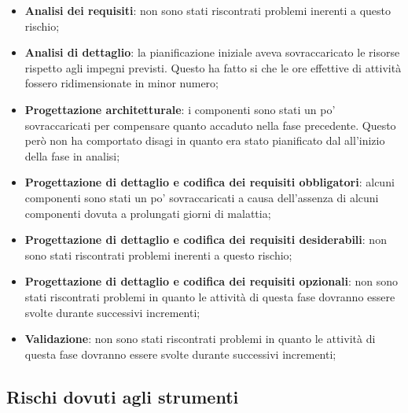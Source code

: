 			\begin{itemize}
				\item \textbf{Analisi dei requisiti}: non sono stati riscontrati problemi inerenti a questo rischio;
				\item \textbf{Analisi di dettaglio}: la pianificazione iniziale aveva sovraccaricato le risorse rispetto agli impegni previsti. Questo ha fatto si che le ore effettive di attività fossero ridimensionate in minor numero;
				\item \textbf{Progettazione architetturale}: i componenti sono stati un po' sovraccaricati per compensare quanto accaduto nella fase precedente. Questo però non ha comportato disagi in quanto era stato pianificato dal \roleProjectManager{} all'inizio della fase in analisi;
				\item \textbf{Progettazione di dettaglio e codifica dei requisiti obbligatori}: alcuni componenti sono stati un po' sovraccaricati a causa dell'assenza di alcuni componenti dovuta a prolungati giorni di malattia;
				\item \textbf{Progettazione di dettaglio e codifica dei requisiti desiderabili}: non sono stati riscontrati problemi inerenti a questo rischio;
				\item \textbf{Progettazione di dettaglio e codifica dei requisiti opzionali}: non sono stati riscontrati problemi in quanto le attività di questa fase dovranno essere svolte durante successivi incrementi;
				\item \textbf{Validazione}: non sono stati riscontrati problemi in quanto le attività di questa fase dovranno essere svolte durante successivi incrementi;
			\end{itemize}



	\subsection{Rischi dovuti agli strumenti} %
	\label{sub:rischi_dovuti_agli_strumenti}
